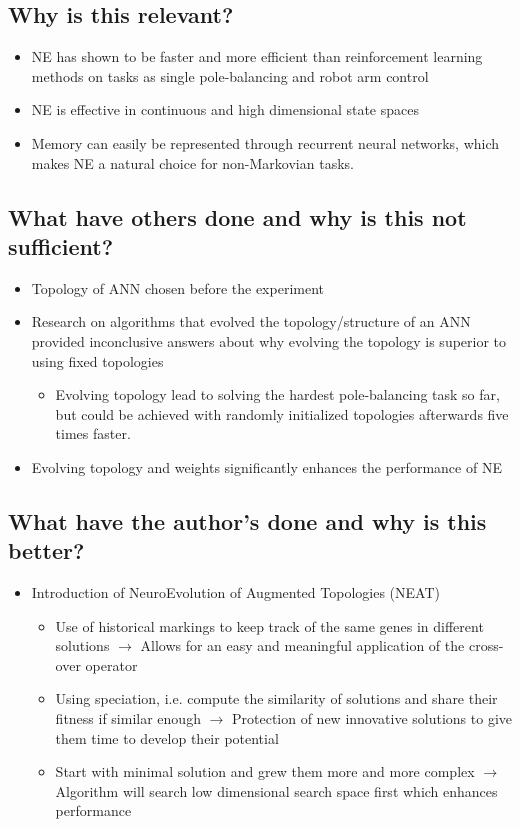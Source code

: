 \documentclass[paper=a4, fontsize=11pt]{scrartcl} %
\numberwithin{equation}{section} %
\numberwithin{figure}{section} %
\numberwithin{table}{section} %
\begin{document}
\subsection{Why is this relevant?}
\begin{itemize}
	\item NE has shown to be faster and more efficient than reinforcement learning methods on tasks as single pole-balancing and robot arm control
	\item NE is effective in continuous and high dimensional state spaces
	\item Memory can easily be represented through recurrent neural networks, which makes NE a natural choice for non-Markovian tasks.
\end{itemize}

\subsection{What have others done and why is this not sufficient?}
\begin{itemize}
	\item Topology of ANN chosen before the experiment
	\item Research on algorithms that evolved the topology/structure of an ANN provided inconclusive answers about why evolving the topology is superior to using fixed topologies
	\begin{itemize}
		\item Evolving topology lead to solving the hardest pole-balancing task so far, but could be achieved with randomly initialized topologies afterwards five times faster.
	\end{itemize}
	\item Evolving topology and weights significantly enhances the performance of NE
\end{itemize}

\subsection{What have the author's done and why is this better?}
\begin{itemize}
	\item Introduction of NeuroEvolution of Augmented Topologies (NEAT)
	\begin{itemize}
		\item Use of historical markings to keep track of the same genes in different solutions $\rightarrow$ Allows for an easy and meaningful application of the cross-over operator
		\item Using speciation, i.e. compute the similarity of solutions and share their fitness if similar enough $\rightarrow$ Protection of new innovative solutions to give them time to develop their potential
		\item Start with minimal solution and grew them more and more complex $\rightarrow$ Algorithm will search low dimensional search space first which enhances performance
	\end{itemize}
\end{itemize}
\end{document}
